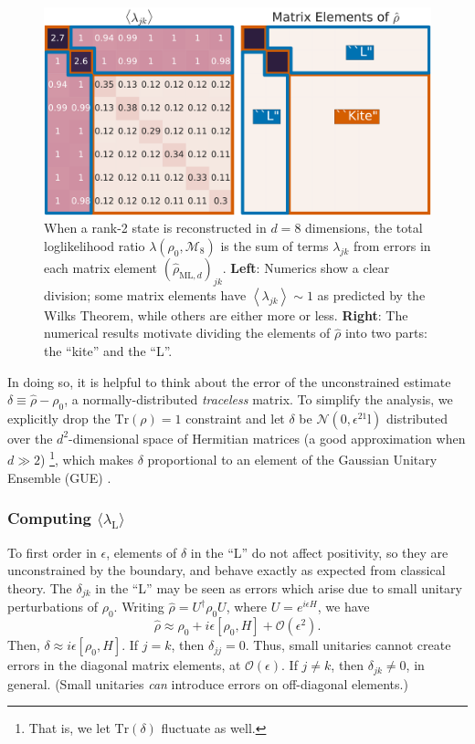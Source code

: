 \documentclass[aps,pra, twocolumn]{revtex4-1}
\newcommand{\Tr}{\mathrm{Tr}}
\newcommand{\Id}{\mathbb{I}}
\newcommand{\expect}[1]{\ensuremath{\left\langle#1\right\rangle}}
\def\Id{1\!\mathrm{l}}
\newcommand{\rhohat}{\hat{\rho}}
\newcommand{\rhoML}[1]{\rhohat_{\scriptscriptstyle{\mathrm{ML},#1}}}
\begin{document}
\begin{figure}[h]
\includegraphics[width=\columnwidth]{Images/Figure_3.pdf}
 \caption{When a rank-2 state is reconstructed in $d=8$ dimensions, the total loglikelihood ratio $\lambda(\rho_0,\mathcal{M}_8)$ is the sum of terms $\lambda_{jk}$ from errors in each matrix element $(\rhoML{d})_{jk}$.  \textbf{Left}:  Numerics show a clear division; some matrix elements have $\expect{\lambda_{jk}}\sim1$ as predicted by the Wilks Theorem, while others are either more or less. \textbf{Right}:  The numerical results motivate dividing the elements of $\rhohat$ into two parts: the ``kite'' and the ``L''.}
\label{fig:L}
\end{figure}

In doing so, it is helpful to think about the error of the unconstrained estimate $\delta \equiv \hat\rho- \rho_{0}$, a normally-distributed \emph{traceless} matrix.  To simplify the analysis, we explicitly drop the $\Tr(\rho)=1$ constraint and let $\delta$ be $\mathcal{N}(0,\epsilon^2\Id)$ distributed over the $d^2$-dimensional space of Hermitian matrices (a good approximation when $d\gg2$) \footnote{That is, we let $\mathrm{Tr}(\delta)$ fluctuate as well.}, which makes $\delta$ proportional to an element of the Gaussian Unitary Ensemble (GUE) \cite{Fyodorov2005}.

\subsubsection{Computing $\langle \lambda_\mathrm{L}\rangle$}

To first order in $\epsilon$, elements of $\delta$ in the ``L'' do not affect positivity, so they are unconstrained by the boundary, and behave exactly as expected from classical theory. The $\delta_{jk}$ in the ``L'' may be seen as errors which arise due to small unitary perturbations of $\rho_{0}$. Writing $\rhohat = U^{\dagger}\rho_{0}U$, where $U=e^{i\epsilon H}$, we have
\[\rhohat \approx \rho_{0} + i\epsilon [\rho_{0},H]+\mathcal{O}(\epsilon^{2}).\]
Then, $\delta \approx i\epsilon [\rho_{0},H]$.
If $j = k$, then $\delta_{jj} = 0$. Thus, small unitaries cannot create errors in the diagonal matrix elements, at $\mathcal{O}(\epsilon)$. If $j \neq k$, then $\delta_{jk} \neq 0$, in general. (Small unitaries \emph{can} introduce errors on off-diagonal elements.)
\end{document}
